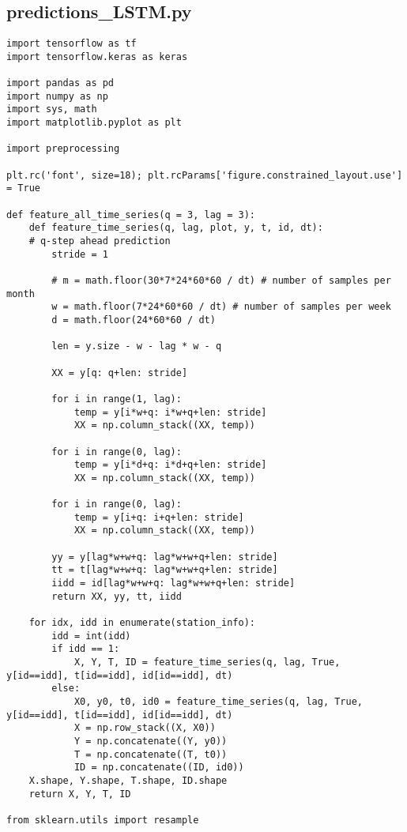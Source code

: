 \subsection{predictions\_LSTM.py}
\begin{lstlisting}
import tensorflow as tf
import tensorflow.keras as keras

import pandas as pd
import numpy as np
import sys, math
import matplotlib.pyplot as plt

import preprocessing

plt.rc('font', size=18); plt.rcParams['figure.constrained_layout.use'] = True

def feature_all_time_series(q = 3, lag = 3):
    def feature_time_series(q, lag, plot, y, t, id, dt):
    # q-step ahead prediction
        stride = 1

        # m = math.floor(30*7*24*60*60 / dt) # number of samples per month
        w = math.floor(7*24*60*60 / dt) # number of samples per week
        d = math.floor(24*60*60 / dt)

        len = y.size - w - lag * w - q

        XX = y[q: q+len: stride]
            
        for i in range(1, lag):
            temp = y[i*w+q: i*w+q+len: stride]
            XX = np.column_stack((XX, temp))

        for i in range(0, lag):
            temp = y[i*d+q: i*d+q+len: stride]
            XX = np.column_stack((XX, temp))

        for i in range(0, lag):
            temp = y[i+q: i+q+len: stride]
            XX = np.column_stack((XX, temp))

        yy = y[lag*w+w+q: lag*w+w+q+len: stride]
        tt = t[lag*w+w+q: lag*w+w+q+len: stride]
        iidd = id[lag*w+w+q: lag*w+w+q+len: stride]
        return XX, yy, tt, iidd

    for idx, idd in enumerate(station_info):
        idd = int(idd)
        if idd == 1:
            X, Y, T, ID = feature_time_series(q, lag, True, y[id==idd], t[id==idd], id[id==idd], dt)
        else:
            X0, y0, t0, id0 = feature_time_series(q, lag, True, y[id==idd], t[id==idd], id[id==idd], dt)
            X = np.row_stack((X, X0))
            Y = np.concatenate((Y, y0))
            T = np.concatenate((T, t0))
            ID = np.concatenate((ID, id0))
    X.shape, Y.shape, T.shape, ID.shape
    return X, Y, T, ID

from sklearn.utils import resample


\end{lstlisting}
